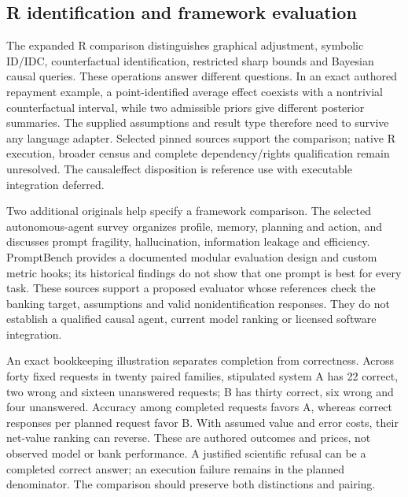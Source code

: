 \hypertarget{r-identification-and-framework-evaluation}{%
\subsection{R identification and framework
evaluation}\label{r-identification-and-framework-evaluation}}

The expanded R comparison distinguishes graphical adjustment, symbolic
ID/IDC, counterfactual identification, restricted sharp bounds and
Bayesian causal queries. These operations answer different questions. In
an exact authored repayment example, a point-identified average effect
coexists with a nontrivial counterfactual interval, while two admissible
priors give different posterior summaries. The supplied assumptions and
result type therefore need to survive any language adapter. Selected
pinned sources support the comparison; native R execution, broader
census and complete dependency/rights qualification remain unresolved.
The causaleffect disposition is reference use with executable
integration deferred. \citep{sp18f_r_identification}

Two additional originals help specify a framework comparison. The
selected autonomous-agent survey organizes profile, memory, planning and
action, and discusses prompt fragility, hallucination, information
leakage and efficiency. PromptBench provides a documented modular
evaluation design and custom metric hooks; its historical findings do
not show that one prompt is best for every task. These sources support a
proposed evaluator whose references check the banking target,
assumptions and valid nonidentification responses. They do not establish
a qualified causal agent, current model ranking or licensed software
integration.
\citep{exec18_framework_agents_survey,exec18_framework_promptbench}

An exact bookkeeping illustration separates completion from correctness.
Across forty fixed requests in twenty paired families, stipulated system
A has 22 correct, two wrong and sixteen unanswered requests; B has
thirty correct, six wrong and four unanswered. Accuracy among completed
requests favors A, whereas correct responses per planned request favor
B. With assumed value and error costs, their net-value ranking can
reverse. These are authored outcomes and prices, not observed model or
bank performance. A justified scientific refusal can be a completed
correct answer; an execution failure remains in the planned denominator.
The comparison should preserve both distinctions and pairing.
\citep{exec18_framework_reference,sp18f_framework_review}

